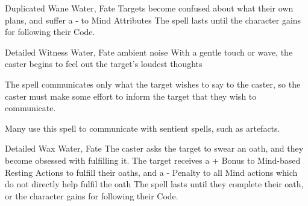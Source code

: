 \ifodd\value{diceNo}

  {Duplicated}%
  {Wane}%
  {Water, Fate}%
  {}%
  {Targets become confused about what their own plans, and suffer a - to Mind Attributes}%
  {The spell lasts until the character gains  for following their Code.}

  {Detailed}%
  {Witness}%
  {Water, Fate}%
  {ambient noise}%
  {With a gentle touch or wave, the caster begins to feel out the target's loudest thoughts}%
  {The spell communicates only what the target wishes to say to the caster, so the caster must make some effort to inform the target that they wish to communicate.

  Many use this spell to communicate with sentient spells, such as \glspl{artefact}.}

\else

  {Detailed}%
  {Wax}%
  {Water, Fate}%
  {}%
  {The caster asks the target to swear an oath, and they become obsessed with fulfilling it.
  The target receives a + Bonus to Mind-based Resting Actions to fulfill their oaths, and a - Penalty to all Mind actions which do not directly help fulfil the oath}%
  {The spell lasts until they complete their oath, or the character gains  for following their Code.}

\fi
{}
